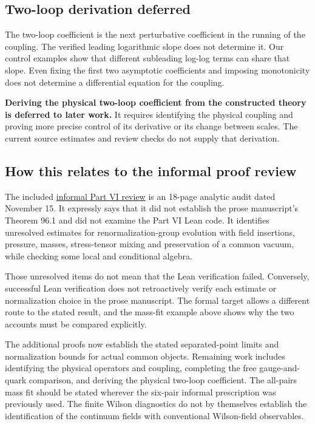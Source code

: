 \documentclass[
  11pt,
]{article}
\begin{document}
\subsection{Two-loop derivation
deferred}\label{two-loop-derivation-deferred}

The two-loop coefficient is the next perturbative coefficient in the
running of the coupling. The verified leading logarithmic slope does not
determine it. Our control examples show that different subleading
log-log terms can share that slope. Even fixing the first two asymptotic
coefficients and imposing monotonicity does not determine a differential
equation for the coupling.

\textbf{Deriving the physical two-loop coefficient from the constructed
theory is deferred to later work.} It requires identifying the physical
coupling and proving more precise control of its derivative or its
change between scales. The current source estimates and review checks do
not supply that derivation.

\subsection{How this relates to the informal proof
review}\label{how-this-relates-to-the-informal-proof-review}

The included
\href{https://github.com/yang-mills-group/QCD/blob/main/docs/informal-part-VI-review-r02.pdf}{informal
Part VI review} is an 18-page analytic audit dated November 15. It
expressly says that it did not establish the prose manuscript's Theorem
96.1 and did not examine the Part VI Lean code. It identifies unresolved
estimates for renormalization-group evolution with field insertions,
pressure, masses, stress-tensor mixing and preservation of a common
vacuum, while checking some local and conditional algebra.

Those unresolved items do not mean that the Lean verification failed.
Conversely, successful Lean verification does not retroactively verify
each estimate or normalization choice in the prose manuscript. The
formal target allows a different route to the stated result, and the
mass-fit example above shows why the two accounts must be compared
explicitly.

The additional proofs now establish the stated separated-point limits
and normalization bounds for actual common objects. Remaining work
includes identifying the physical operators and coupling, completing the
free gauge-and-quark comparison, and deriving the physical two-loop
coefficient. The all-pairs mass fit should be stated wherever the
six-pair informal prescription was previously used. The finite Wilson
diagnostics do not by themselves establish the identification of the
continuum fields with conventional Wilson-field observables.
\end{document}
